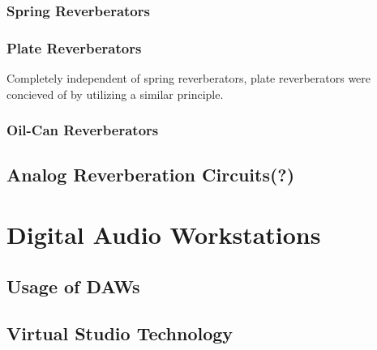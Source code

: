 \subsubsection{Spring Reverberators}
\subsubsection{Plate Reverberators}
Completely independent of spring reverberators, plate reverberators were concieved of by utilizing a similar principle.

\subsubsection{Oil-Can Reverberators}
\subsection{Analog Reverberation Circuits(?)}
\section{Digital Audio Workstations}
\subsection{Usage of DAWs}
\subsection{Virtual Studio Technology}
